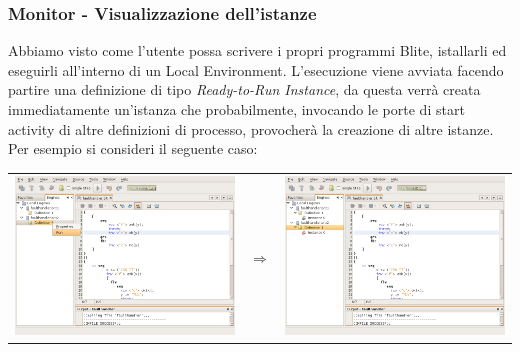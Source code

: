 \subsubsection*{Monitor - Visualizzazione dell'istanze}

Abbiamo visto come l'utente possa scrivere i propri programmi Blite, istallarli
ed eseguirli all'interno di un Local Environment. L'esecuzione viene avviata
facendo partire una definizione di tipo \emph{Ready-to-Run Instance}, da
questa verrà creata immediatamente un'istanza che probabilmente, invocando le
porte di start activity di altre definizioni di processo, provocherà la
creazione di altre istanze. Per esempio si consideri il seguente caso:

\vspace{0.5cm}

\begin{center}
\begin{tabular}{ccc}
\includegraphics[scale=0.75]{blide/dia/BlideMon1} 
& $\Rightarrow$
& \includegraphics[scale=0.75]{blide/dia/BlideMon2}    
\end{tabular}
\end{center}
